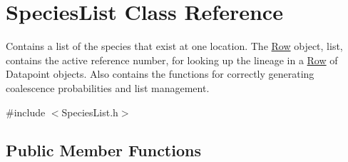 \hypertarget{class_species_list}{}\section{Species\+List Class Reference}
\label{class_species_list}


Contains a list of the species that exist at one location. The \hyperlink{class_row}{Row} object, list, contains the active reference number, for looking up the lineage in a \hyperlink{class_row}{Row} of Datapoint objects. Also contains the functions for correctly generating coalescence probabilities and list management.  




{\ttfamily \#include $<$Species\+List.\+h$>$}

\subsection*{Public Member Functions}

